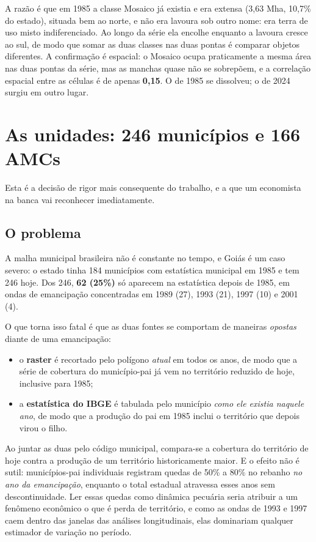 A razão é que em 1985 a classe Mosaico já existia e era extensa (3,63 Mha,
10,7\% do estado), situada bem ao norte, e não era lavoura sob outro nome: era
terra de uso misto indiferenciado. Ao longo da série ela encolhe enquanto a
lavoura cresce ao sul, de modo que somar as duas classes nas duas pontas é
comparar objetos diferentes. A confirmação é espacial: o Mosaico ocupa
praticamente a mesma área nas duas pontas da série, mas as manchas quase não se
sobrepõem, e a correlação espacial entre as células é de apenas \textbf{0,15}.
O de 1985 se dissolveu; o de 2024 surgiu em outro lugar.

\chapter{As unidades: 246 municípios e 166 AMCs}

Esta é a decisão de rigor mais consequente do trabalho, e a que um economista
na banca vai reconhecer imediatamente.

\section{O problema}

A malha municipal brasileira não é constante no tempo, e Goiás é um caso
severo: o estado tinha 184 municípios com estatística municipal em 1985 e tem
246 hoje. Dos 246, \textbf{62 (25\%)} só aparecem na estatística depois de
1985, em ondas de emancipação concentradas em 1989 (27), 1993 (21), 1997 (10) e
2001 (4).

O que torna isso fatal é que as duas fontes se comportam de maneiras
\emph{opostas} diante de uma emancipação:

\begin{itemize}
\item o \textbf{raster} é recortado pelo polígono \emph{atual} em todos os
anos, de modo que a série de cobertura do município-pai já vem no território
reduzido de hoje, inclusive para 1985;
\item a \textbf{estatística do IBGE} é tabulada pelo município \emph{como ele
existia naquele ano}, de modo que a produção do pai em 1985 inclui o território
que depois virou o filho.
\end{itemize}

Ao juntar as duas pelo código municipal, compara-se a cobertura do território de
hoje contra a produção de um território historicamente maior. E o efeito não é
sutil: municípios-pai individuais registram quedas de 50\% a 80\% no rebanho
\emph{no ano da emancipação}, enquanto o total estadual atravessa esses anos
sem descontinuidade. Ler essas quedas como dinâmica pecuária seria atribuir a
um fenômeno econômico o que é perda de território, e como as ondas de 1993 e
1997 caem dentro das janelas das análises longitudinais, elas dominariam
qualquer estimador de variação no período.

